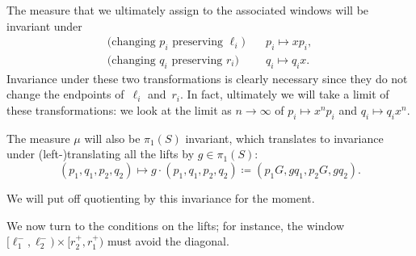 \begin{figure}
\end{figure}
The measure that we ultimately assign to the associated windows will
be invariant under
\begin{subequations}\label{eq:changes}
\begin{align}
\text{(changing $p_i$ preserving $\ell_i$)} \quad & p_i \mapsto xp_i, \label{eq:changes-p}\\
\text{(changing $q_i$ preserving $r_i$)} \quad & q_i \mapsto q_ix. \label{eq:changes-q}
\end{align}
\end{subequations}
Invariance under these two transformations is clearly necessary since
they do not change the endpoints of~$\ell_i$ and~$r_i$.
In fact, ultimately we will take a limit of these
transformations: we look at the limit as $n\to \infty$ of $p_i \mapsto x^np_i$
and $q_i \mapsto q_i x^n$.

The measure $\mu$ will also be $\pi_1(S)$ invariant, which translates to
invariance under
(left-)translating all the lifts by $g \in \pi_1(S)$:
  \begin{equation}\label{eq:box-translate}
    (p_1,q_1,p_2,q_2) \mapsto g \cdot (p_1,q_1,p_2,q_2) \coloneqq
      (p_1 G, gq_1, p_2 G,  gq_2).
  \end{equation}

We will put off quotienting by this invariance for the moment.

We now turn to the conditions on the lifts; for
instance, the window
$[\ell_1^-,\ell_2^-) \times [r_2^+,r_1^+)$ must avoid the
diagonal.

